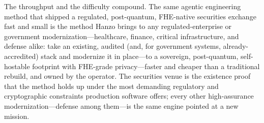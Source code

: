 \documentclass[11pt,letterpaper]{article}
\begin{document}
The throughput and the difficulty compound. The same agentic engineering method
that shipped a regulated, post-quantum, FHE-native securities exchange fast and
small is the method Hanzo brings to any regulated-enterprise or government
modernization---healthcare, finance, critical infrastructure, and defense alike:
take an existing, audited (and, for government systems, already-accredited) stack
and modernize it in place---to a sovereign,
post-quantum, self-hostable footprint with FHE-grade privacy---faster and cheaper
than a traditional rebuild, and owned by the operator. The securities venue is the
existence proof that the method holds up under the most demanding regulatory and
cryptographic constraints production software offers; every other high-assurance
modernization---defense among them---is the same engine pointed at a new mission.
\end{document}

